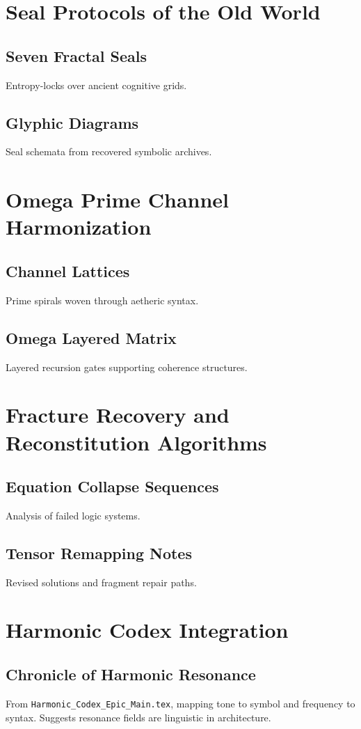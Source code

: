 \documentclass[12pt]{article}
\begin{document}
\section{Seal Protocols of the Old World}
\subsection{Seven Fractal Seals}
Entropy-locks over ancient cognitive grids.

\subsection{Glyphic Diagrams}
Seal schemata from recovered symbolic archives.

\section{Omega Prime Channel Harmonization}
\subsection{Channel Lattices}
Prime spirals woven through aetheric syntax.

\subsection{Omega Layered Matrix}
Layered recursion gates supporting coherence structures.

\section{Fracture Recovery and Reconstitution Algorithms}
\subsection{Equation Collapse Sequences}
Analysis of failed logic systems.

\subsection{Tensor Remapping Notes}
Revised solutions and fragment repair paths.

\section{Harmonic Codex Integration}
\subsection{Chronicle of Harmonic Resonance}
From \texttt{Harmonic\_Codex\_Epic\_Main.tex}, mapping tone to symbol and frequency to syntax. Suggests resonance fields are linguistic in architecture.
\end{document}
